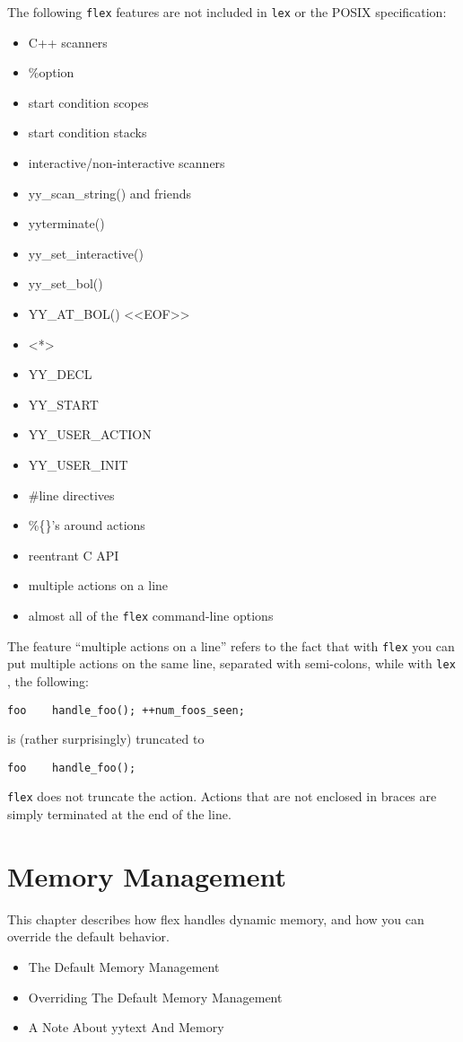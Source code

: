 \documentclass[openany,oneside]{book}
\begin{document}
The following \verb`flex` features are not included in \verb`lex` or the
POSIX specification:
\begin{itemize}
\item C++ scanners
\item \%{}option
\item start condition scopes
\item start condition stacks
\item interactive/non-interactive scanners
\item yy\_{}scan\_{}string() and friends
\item yyterminate()
\item yy\_{}set\_{}interactive()
\item yy\_{}set\_{}bol()
\item YY\_{}AT\_{}BOL()
   <<EOF>>
\item <*>
\item YY\_{}DECL
\item YY\_{}START
\item YY\_{}USER\_{}ACTION
\item YY\_{}USER\_{}INIT
\item \#{}line directives
\item \%{}\{{}\}{}'s around actions
\item reentrant C API
\item multiple actions on a line
\item almost all of the \verb`flex` command-line options
\end{itemize}


The feature “multiple actions on a line”
refers to the fact that with \verb`flex` you can put multiple actions on
the same line, separated with semi-colons, while with \verb`lex` , the
following:
\begin{verbatim}
foo    handle_foo(); ++num_foos_seen;
\end{verbatim}


is (rather surprisingly) truncated to
\begin{verbatim}
foo    handle_foo();
\end{verbatim}


 \verb`flex` does not truncate the action.  Actions that are not enclosed
in braces are simply terminated at the end of the line.
\chapter{Memory Management}


This chapter describes how flex handles dynamic memory, and how you can
override the default behavior.
\begin{itemize}
\item The Default Memory Management
\item Overriding The Default Memory Management
\item A Note About yytext And Memory
\end{itemize}
\end{document}
